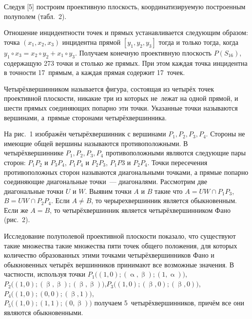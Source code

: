 

Следуя [5] построим проективную плоскость, координатизируемую построенным полуполем (табл.~2).



Отношение инцидентности точек и прямых устанавливается следующим образом: точка $(x_1,x_2,x_3)$ инцидентна прямой $[y_1,y_2,y_3]$ тогда и только тогда, когда $y_1 \circ x_3 = x_2 \circ y_2 + x_1 \circ y_3$. Получаем конечную проективную плоскость $P(S_{16})$, содержащую 273 точки и столько же прямых. При этом каждая точка инцидентна в точности 17~прямым, а каждая прямая содержит 17~точек.



Четырёхвершинником называется  фигура, состоящая из четырёх точек проективной плоскости, никакие три из которых не~лежат на одной прямой, и шести прямых соединяющих попарно эти точки. Указанные точки называются вершинами, а~прямые сторонами четырёхвершинника.

На рис.~1 изображён четырёхвершинник с вершинами $P_1, P_2, P_3, P_4$. Стороны не имеющие общей вершины называются противоположными. В четырёхвершиннике $P_1, P_2, P_3, P_4$ противоположными являются следующие пары сторон: $P_1P_2$ и $P_3P_4$, $P_1P_4$ и $P_2P_3$, $P_1P3$ и $P_2P_4$. Точки пересечения противоположных сторон называются диагональными точками, а прямые попарно соединяющие диагональные точки~--- диагоналями. Рассмотрим две диагональные точки $U$ и $W$. Выявим точки $A$ и $B$ такие что $A = UW \cap P_1P_3$, $B = UW \cap P_2P_4$. Если $A \neq B$, то черырехвершинник является обыкновенным. Если же $A = B$, то четырёхвершинник является четырёхвершинником Фано (рис.~2).

\vspace{-8pt}





Исследование полуполевой проективной плоскости  показало, что существуют такие множества такие множества пяти точек общего положения, для которых количество образованных этими точками четырёхвершинников Фано и обыкновенных четырёх вершинников принимают все возможные значения. В частности, используя точки $P_1 \bigl((1,0);(\upalpha,\upbeta);(1,\upalpha)\bigr)$, $P_2 \bigl((1,0);(\upbeta,\upbeta);(\upbeta,\upbeta)\bigr)$,\quad\quad $P_3 \bigl((1,0);(\upbeta,0);(\upbeta,0)\bigr)$,\quad\quad $P_4 \bigl((1,0);(0,0);(\upbeta,1)\bigr)$,\\ $P_5 \bigl((1,0);(1,1);(0,\upbeta)\bigr)$  получаем 5~четырёхвершинников, причём все они являются обыкновенными.

